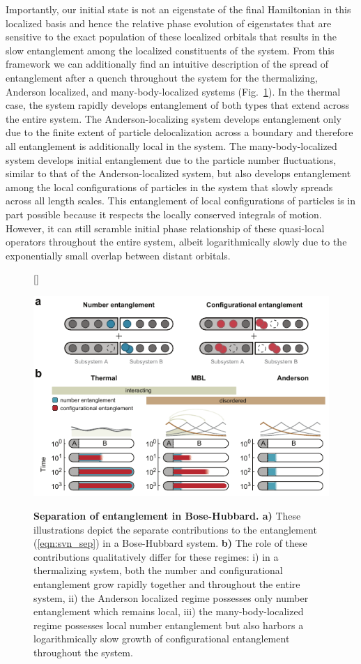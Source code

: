 Importantly, our initial state is not an eigenstate of the final Hamiltonian in this localized basis and hence the relative phase evolution of eigenstates that are sensitive to the exact population of these localized orbitals that results in the slow entanglement among the localized constituents of the system. From this framework we can additionally find an intuitive description of the spread of entanglement after a quench throughout the system for the thermalizing, Anderson localized, and many-body-localized systems (Fig.~\ref{fig:ch5fig1}). In the thermal case, the system rapidly develops entanglement of both types that extend across the entire system. The Anderson-localizing system develops entanglement only due to the finite extent of particle delocalization across a boundary and therefore all entanglement is additionally local in the system. The many-body-localized system develops initial entanglement due to the particle number fluctuations, similar to that of the Anderson-localized system, but also develops entanglement among the local configurations of particles in the system that slowly spreads across all length scales. This entanglement of local configurations of particles is in part possible because it respects the locally conserved integrals of motion. However, it can still scramble initial phase relationship of these quasi-local operators throughout the entire system, albeit logarithmically slowly due to the exponentially small overlap between distant orbitals.

\begin{figure}
[\FBwidth]
{\caption{\textbf{Separation of entanglement in Bose-Hubbard. a)} These illustrations depict the separate contributions to the entanglement (\ref{eqn:svn_sep}) in a Bose-Hubbard system. \textbf{b)} The role of these contributions qualitatively differ for these regimes: i) in a thermalizing system, both the number and configurational entanglement grow rapidly together and throughout the entire system, ii) the Anderson localized regime possesses only number entanglement which remains local, iii) the many-body-localized regime possesses local number entanglement but also harbors a logarithmically slow growth of configurational entanglement throughout the system.}\label{fig:ch5fig1}}
{\includegraphics[width=4 in]{figures/ch5/figure1.pdf}} 
\end{figure}

